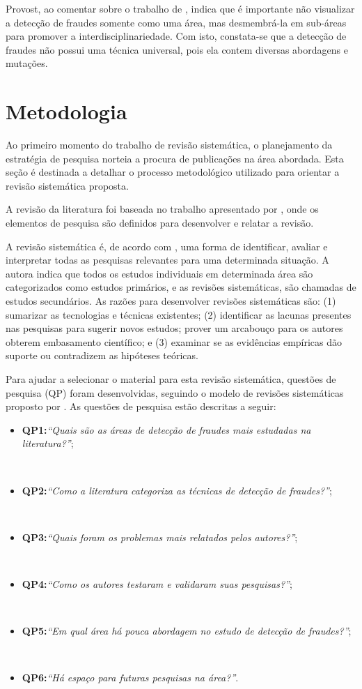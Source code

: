 \documentclass[smallextended]{svjour3}
\begin{document}
Provost, ao comentar sobre o trabalho de \cite{Bolton2002}, indica que é importante não visualizar a detecção de fraudes somente como uma área, mas desmembrá-la em sub-áreas para promover a interdisciplinariedade. Com isto, constata-se que a detecção de fraudes não possui uma técnica universal, pois ela contem diversas abordagens e mutações. 

\section{Metodologia}
\label{sec:3}

Ao primeiro momento do trabalho de revisão sistemática, o planejamento da estratégia de pesquisa norteia a procura de publicações na área abordada. Esta seção é destinada a detalhar o processo metodológico utilizado para orientar a revisão sistemática proposta.

A revisão da literatura foi baseada no trabalho apresentado por \cite{Kitchenham07guidelinesfor}, onde os elementos de pesquisa são definidos para desenvolver e relatar a revisão.

A revisão sistemática é, de acordo com \cite{Kitchenham2004}, uma forma de identificar, avaliar e interpretar todas as pesquisas relevantes para uma determinada situação. A autora indica que todos os estudos individuais em determinada área são categorizados como estudos primários, e as revisões sistemáticas, são chamadas de estudos secundários. As razões para desenvolver revisões sistemáticas são: (1) sumarizar as tecnologias e técnicas existentes; (2) identificar as lacunas presentes nas pesquisas para sugerir novos estudos; prover um arcabouço para os autores obterem embasamento científico; e (3) examinar se as evidências empíricas dão suporte ou contradizem as hipóteses teóricas. 

Para ajudar a selecionar o material para esta revisão sistemática, questões de pesquisa (QP) foram desenvolvidas, seguindo o modelo de revisões sistemáticas proposto por \cite{Kitchenham07guidelinesfor}. As questões de pesquisa estão descritas a seguir:

\begin{itemize}
	\item \textbf{QP1:}\textit{“Quais são as áreas de detecção de fraudes mais estudadas na literatura?”};
	 
	\
	\item \textbf{QP2:}\textit{“Como a literatura categoriza as técnicas de detecção de fraudes?”};
	
	\
	\item \textbf{QP3:}\textit{“Quais foram os problemas mais relatados pelos autores?”};
	
	\
	\item \textbf{QP4:}\textit{“Como os autores testaram e validaram suas pesquisas?”};
	
	\
	\item \textbf{QP5:}\textit{“Em qual área há pouca abordagem no estudo de detecção de fraudes?”};
	
	\
	\item \textbf{QP6:}\textit{“Há espaço para futuras pesquisas na área?”}.
		
\end{itemize}
\end{document}
